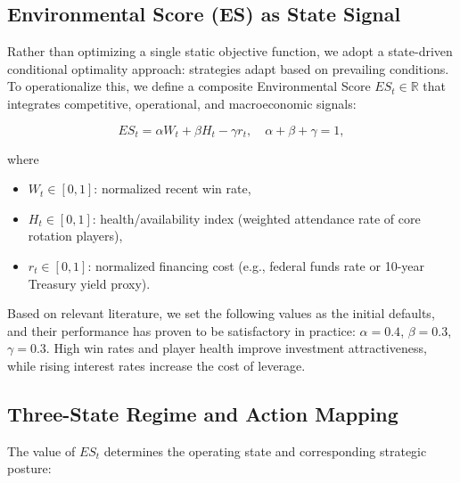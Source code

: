 \documentclass{mcmthesis}
\begin{document}
\subsection{Environmental Score (ES) as State Signal}
Rather than optimizing a single static objective function, we adopt a state-driven conditional optimality approach: strategies adapt based on prevailing conditions. To operationalize this, we define a composite Environmental Score $ES_t \in \mathbb{R}$ that integrates competitive, operational, and macroeconomic signals:

\[
ES_t = \alpha W_t + \beta H_t - \gamma r_t, \quad \alpha + \beta + \gamma = 1,
\]

where
\begin{itemize}
    \item $W_t \in [0,1]$: normalized recent win rate,
    \item $H_t \in [0,1]$: health/availability index (weighted attendance rate of core rotation players),
    \item $r_t \in [0,1]$: normalized financing cost (e.g., federal funds rate or 10-year Treasury yield proxy).
\end{itemize}

Based on relevant literature, we set the following values as the initial defaults, and their performance has proven to be satisfactory in practice: $\alpha = 0.4$, $\beta = 0.3$, $\gamma = 0.3$\cite{ForbesNBAValuations2025}\cite{SporticoNBAValuations2025}. High win rates and player health improve investment attractiveness, while rising interest rates increase the cost of leverage.

\subsection{Three-State Regime and Action Mapping}
The value of $ES_t$ determines the operating state and corresponding strategic posture:
\end{document}
